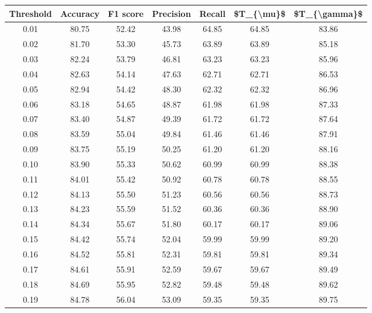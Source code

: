 \begin{tabular}{|c|c|c|c|c|c|c|}
\hline
 Threshold &  Accuracy &  F1 score &  Precision &  Recall &  \$T\_\{\textbackslash mu\}\$ &  \$T\_\{\textbackslash gamma\}\$ \\
\hline
      0.01 &     80.75 &     52.42 &      43.98 &   64.85 &      64.85 &         83.86 \\
      0.02 &     81.70 &     53.30 &      45.73 &   63.89 &      63.89 &         85.18 \\
      0.03 &     82.24 &     53.79 &      46.81 &   63.23 &      63.23 &         85.96 \\
      0.04 &     82.63 &     54.14 &      47.63 &   62.71 &      62.71 &         86.53 \\
      0.05 &     82.94 &     54.42 &      48.30 &   62.32 &      62.32 &         86.96 \\
      0.06 &     83.18 &     54.65 &      48.87 &   61.98 &      61.98 &         87.33 \\
      0.07 &     83.40 &     54.87 &      49.39 &   61.72 &      61.72 &         87.64 \\
      0.08 &     83.59 &     55.04 &      49.84 &   61.46 &      61.46 &         87.91 \\
      0.09 &     83.75 &     55.19 &      50.25 &   61.20 &      61.20 &         88.16 \\
      0.10 &     83.90 &     55.33 &      50.62 &   60.99 &      60.99 &         88.38 \\
      0.11 &     84.01 &     55.42 &      50.92 &   60.78 &      60.78 &         88.55 \\
      0.12 &     84.13 &     55.50 &      51.23 &   60.56 &      60.56 &         88.73 \\
      0.13 &     84.23 &     55.59 &      51.52 &   60.36 &      60.36 &         88.90 \\
      0.14 &     84.34 &     55.67 &      51.80 &   60.17 &      60.17 &         89.06 \\
      0.15 &     84.42 &     55.74 &      52.04 &   59.99 &      59.99 &         89.20 \\
      0.16 &     84.52 &     55.81 &      52.31 &   59.81 &      59.81 &         89.34 \\
      0.17 &     84.61 &     55.91 &      52.59 &   59.67 &      59.67 &         89.49 \\
      0.18 &     84.69 &     55.95 &      52.82 &   59.48 &      59.48 &         89.62 \\
      0.19 &     84.78 &     56.04 &      53.09 &   59.35 &      59.35 &         89.75 \\

\end{tabular}
